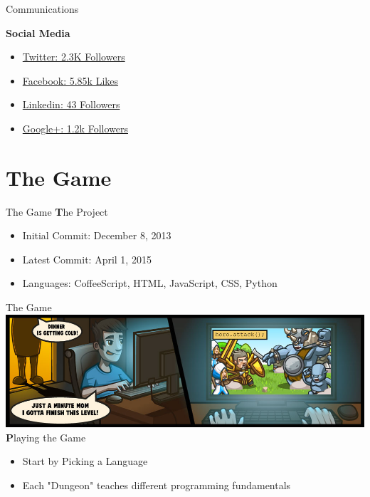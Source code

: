 \documentclass[10pt, compress]{beamer}
\begin{document}
\begin{frame}{Communications}

\textbf{Social Media}
\begin{itemize}
\item \href{https://twitter.com/CodeCombat}{\alert{Twitter: 2.3K Followers}}
\item \href{https://www.facebook.com/codecombat?ref=br_rs }{\alert{Facebook: 5.85k Likes}}
\item \href{https://www.linkedin.com/company/codecombat}{\alert{Linkedin: 43 Followers}}
\item \href{https://plus.google.com/115285980638641924488/}{\alert{Google+: 1.2k Followers}}
\end{itemize}

\end{frame}

\section{The Game}

\begin{frame}{The Game}
    \textbf The Project
    \begin{itemize}
    \item Initial Commit: December 8, 2013
    \item Latest Commit: April 1, 2015
    \item Languages: CoffeeScript, HTML, JavaScript, CSS, Python
    \end{itemize}
\end{frame}

\begin{frame}{The Game}
\includegraphics[width=\textwidth]{images/about_comic.jpg}\\
    \textbf Playing the Game
    \begin{itemize}
    \item Start by Picking a Language
    \item Each "Dungeon" teaches different programming fundamentals
    \end{itemize}
\end{frame}
\end{document}

